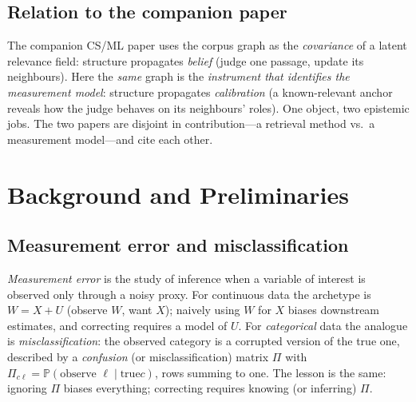 \documentclass[11pt]{article}
\renewcommand{\Pr}{\mathbb{P}}
\begin{document}
\subsection{Relation to the companion paper}
The companion CS/ML paper uses the corpus graph as the \emph{covariance} of a latent relevance field: structure
propagates \emph{belief} (judge one passage, update its neighbours). Here the \emph{same} graph is the
\emph{instrument that identifies the measurement model}: structure propagates \emph{calibration} (a known-relevant
anchor reveals how the judge behaves on its neighbours' roles). One object, two epistemic jobs. The two papers
are disjoint in contribution---a retrieval method vs.\ a measurement model---and cite each other.

\section{Background and Preliminaries}\label{sec:prelim}
\subsection{Measurement error and misclassification}
\emph{Measurement error} is the study of inference when a variable of interest is observed only through a noisy
proxy. For continuous data the archetype is $W=X+U$ (observe $W$, want $X$); naively using $W$ for $X$ biases
downstream estimates, and correcting requires a model of $U$. For \emph{categorical} data the analogue is
\emph{misclassification}: the observed category is a corrupted version of the true one, described by a
\emph{confusion} (or misclassification) matrix $\Pi$ with $\Pi_{c\ell}=\Pr(\text{observe }\ell\mid\text{true
}c)$, rows summing to one. The lesson is the same: ignoring $\Pi$ biases everything; correcting requires
knowing (or inferring) $\Pi$.
\end{document}
